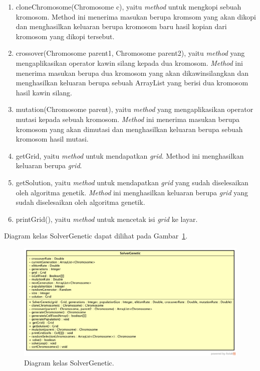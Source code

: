 \begin{enumerate}
\item cloneChromosome(Chromosome c), yaitu \textit{method} untuk mengkopi sebuah kromosom. Method ini menerima masukan berupa kromsom yang akan dikopi dan menghasilkan keluaran berupa kromosom baru hasil kopian dari kromosom yang dikopi tersebut.
\item crossover(Chromosome parent1, Chromosome parent2), yaitu \textit{method} yang mengaplikasikan operator kawin silang kepada dua kromosom. \textit{Method} ini menerima masukan berupa dua kromosom yang akan dikawinsilangkan dan menghasilkan keluaran berupa sebuah ArrayList yang berisi dua kromosom hasil kawin silang.
\item mutation(Chromosome parent), yaitu \textit{method} yang mengaplikasikan operator mutasi kepada sebuah kromosom. \textit{Method} ini menerima masukan berupa kromosom yang akan dimutasi dan menghasilkan keluaran berupa sebuah kromosom hasil mutasi.
\item getGrid, yaitu \textit{method} untuk mendapatkan \textit{grid}. Method ini menghasilkan keluaran berupa \textit{grid}.
\item getSolution, yaitu \textit{method} untuk mendapatkan \textit{grid} yang sudah diselesaikan oleh algoritma genetik. \textit{Method} ini menghasilkan keluaran berupa \textit{grid} yang sudah diselesaikan oleh algoritma genetik.
\item printGrid(), yaitu \textit{method} untuk mencetak isi \textit{grid} ke layar.
\end{enumerate}

Diagram kelas SolverGenetic dapat dilihat pada Gambar~\ref{fig:diagramkelassolvergenetic}.

\begin{figure}
\centering
\captionsetup{justification=centering}
\includegraphics[scale=0.333]{Gambar/Perancangan/DiagramKelasSolverGenetic.png}
\caption[Diagram kelas SolverGenetic.]{Diagram kelas SolverGenetic.}
\label{fig:diagramkelassolvergenetic}
\end{figure}

